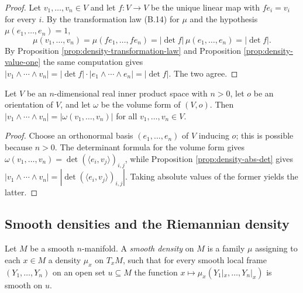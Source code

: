 \begin{proof}
\leanok
{}
Let $v_1, \ldots, v_n \in V$ and let $f : V \to V$ be the unique linear map with $f e_i = v_i$ for
every $i$. By the transformation law (B.14) for $\mu$ and the hypothesis $\mu(e_1,\ldots,e_n) = 1$,
\[
\mu(v_1, \ldots, v_n) = \mu(f e_1, \ldots, f e_n) = |\det f| \, \mu(e_1, \ldots, e_n) = |\det f|.
\]
By Proposition \ref{prop:density-transformation-law} and Proposition \ref{prop:density-value-one}
the same computation gives
$|v_1 \wedge \cdots \wedge v_n| = |\det f| \cdot |e_1 \wedge \cdots \wedge e_n| = |\det f|$.
The two agree.
\end{proof}

\begin{proposition}
\label{prop:density-eq-abs-volume-form}
\leanok
{}
Let $V$ be an $n$-dimensional real inner product space with $n > 0$, let $o$ be an orientation of
$V$, and let $\omega$ be the volume form of $(V, o)$. Then
$|v_1 \wedge \cdots \wedge v_n| = |\omega(v_1, \ldots, v_n)|$ for all $v_1, \ldots, v_n \in V$.
\end{proposition}

\begin{proof}
\leanok
{}
Choose an orthonormal basis $(e_1, \ldots, e_n)$ of $V$ inducing $o$; this is possible because
$n > 0$. The determinant formula for the volume form gives
$\omega(v_1, \ldots, v_n) = \det (\langle e_i, v_j \rangle)_{i,j}$, while Proposition
\ref{prop:density-abs-det} gives
$|v_1 \wedge \cdots \wedge v_n| = |\det (\langle e_i, v_j \rangle)_{i,j}|$. Taking absolute values
of the former yields the latter.
\end{proof}

\subsection{Smooth densities and the Riemannian density}

\begin{definition}
\label{def:smooth-density}
\leanok
{}
Let $M$ be a smooth $n$-manifold. A \emph{smooth density} on $M$ is a family $\mu$ assigning to
each $x \in M$ a density $\mu_x$ on $T_x M$, such that for every smooth local frame
$(Y_1, \ldots, Y_n)$ on an open set $u \subseteq M$ the function
$x \mapsto \mu_x(Y_1|_x, \ldots, Y_n|_x)$ is smooth on $u$.
\end{definition}

